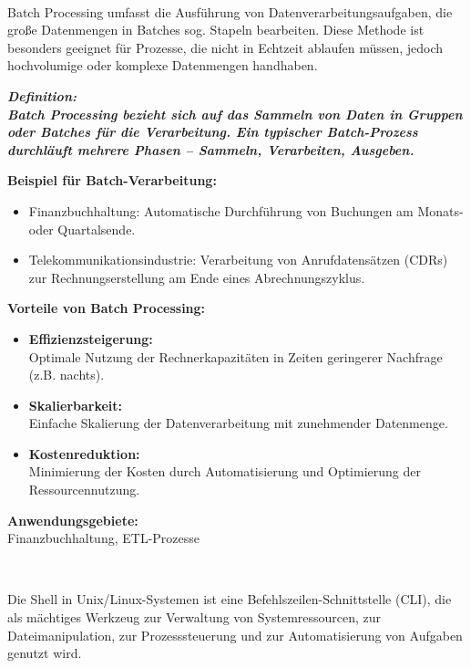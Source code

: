 \documentclass[9pt]{innovativeinnovation-cheatsheet}
\begin{document}
    \begin{multicols*}{4}
	
	 \ \\
	Batch Processing umfasst die Ausführung von Datenverarbeitungsaufgaben, die große Datenmengen in Batches sog. Stapeln bearbeiten. Diese Methode ist besonders geeignet für Prozesse, die nicht in Echtzeit ablaufen müssen, jedoch hochvolumige oder komplexe Datenmengen handhaben.
	
\textit{\textbf{Definition:}} \\
\textit{\textbf{Batch Processing bezieht sich auf das Sammeln von Daten in Gruppen oder Batches für die Verarbeitung. Ein typischer Batch-Prozess durchläuft mehrere Phasen – Sammeln, Verarbeiten, Ausgeben.}}
	
	\textbf{Beispiel für Batch-Verarbeitung:}
	\begin{itemize}
		\item Finanzbuchhaltung: Automatische Durchführung von Buchungen am Monats- oder Quartalsende.
		\item Telekommunikationsindustrie: Verarbeitung von Anrufdatensätzen (CDRs) zur Rechnungserstellung am Ende eines Abrechnungszyklus.
	\end{itemize}
	
	\textbf{Vorteile von Batch Processing:}
	\begin{itemize}
		\item \textbf{Effizienzsteigerung:} \\ Optimale Nutzung der Rechnerkapazitäten in Zeiten geringerer Nachfrage (z.B. nachts).
		\item \textbf{Skalierbarkeit:} \\ Einfache Skalierung der Datenverarbeitung mit zunehmender Datenmenge.
		\item \textbf{Kostenreduktion:} \\Minimierung der Kosten durch Automatisierung und Optimierung der Ressourcennutzung.
	\end{itemize}
	 
	\textbf{Anwendungsgebiete:}  \\
	Finanzbuchhaltung, ETL-Prozesse

\ \\
	

Die Shell in Unix/Linux-Systemen ist eine Befehlszeilen-Schnittstelle (CLI), die als mächtiges Werkzeug zur Verwaltung von Systemressourcen, zur Dateimanipulation, zur Prozesssteuerung und zur Automatisierung von Aufgaben genutzt wird.


\end{multicols*}
\end{document}
